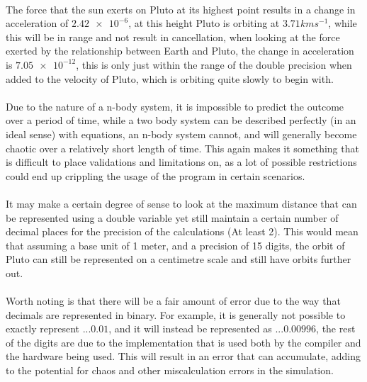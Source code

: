 \paragraph{}
The force that the sun exerts on Pluto at its highest point results in a change in acceleration of $\num{2.42e-6}$, at this height Pluto is orbiting at $3.71 kms^{-1}$, while this will be in range and not result in cancellation, when looking at the force exerted by the relationship between Earth and Pluto, the change in acceleration is $\num{7.05e-12}$, this is only just within the range of the double precision when added to the velocity of Pluto, which is orbiting quite slowly to begin with.

\paragraph{}
Due to the nature of a n-body system, it is impossible to predict the outcome over a period of time, while a two body system can be described perfectly (in an ideal sense) with equations, an n-body system cannot, and will generally become chaotic over a relatively short length of time. This again makes it something that is difficult to place validations and limitations on, as a lot of possible restrictions could end up crippling the usage of the program in certain scenarios.

\paragraph{}
It may make a certain degree of sense to look at the maximum distance that can be represented using a double variable yet still maintain a certain number of decimal places for the precision of the calculations (At least 2). This would mean that assuming a base unit of 1 meter, and a precision of 15 digits, the orbit of Pluto can still be represented on a centimetre scale and still have orbits further out.

\paragraph{}
Worth noting is that there will be a fair amount of error due to the way that decimals are represented in binary. For example, it is generally not possible to exactly represent $...0.01$, and it will instead be represented as $...0.00996$, the rest of the digits are due to the implementation that is used both by the compiler and the hardware being used. This will result in an error that can accumulate, adding to the potential for chaos and other miscalculation errors in the simulation. 


